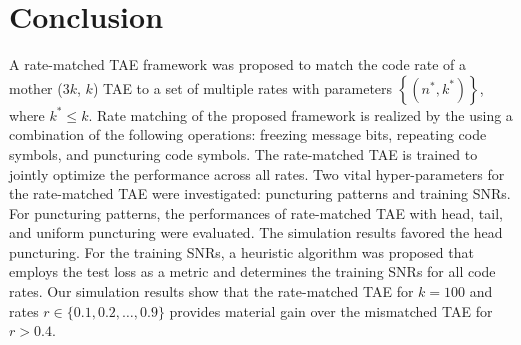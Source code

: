 \documentclass [PhD] {uclathes}
\begin{document}
\section{Conclusion}\label{sec: conclusion_5}
A rate-matched TAE framework was proposed to match the code rate of a mother ($3k$, $k$) TAE to a set of multiple rates with parameters $\left\{(n^*,k^*)\right\}$, where $k^*\leq k$. Rate matching of the proposed framework is realized by the using a combination of the following operations: freezing message bits, repeating code symbols, and puncturing code symbols. The rate-matched TAE is trained to jointly optimize the performance across all rates. 
Two vital hyper-parameters for the rate-matched TAE were investigated: puncturing patterns and training SNRs. For puncturing patterns, the performances of rate-matched TAE with head, tail, and uniform puncturing were evaluated. The simulation results favored the head puncturing. For the training SNRs, a heuristic algorithm was proposed that employs the test loss as a metric and determines the training SNRs for all code rates.  Our simulation results show that the rate-matched TAE for $k=100$ and rates $r\in \{0.1,0.2,\ldots,0.9\}$ provides material gain over the mismatched TAE for $r>0.4$.


%
\end{document}
